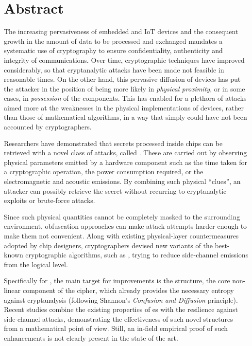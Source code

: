 \chapter*{Abstract}\label{chap:Abstract}
The increasing pervasiveness of embedded and IoT devices and the consequent growth in the amount of data to be processed and exchanged mandates a systematic use of cryptography to ensure confidentiality, authenticity and integrity of communications. Over time, cryptographic techniques have improved considerably, so that cryptanalytic attacks have been made not feasible in reasonable times. On the other hand, this pervasive diffusion of devices has put the attacker in the position of being more likely in \emph{physical proximity}, or in some cases, in \emph{possession} of the components. This has enabled for a plethora of attacks aimed more at the weaknesses in the physical implementations of devices, rather than those of mathematical algorithms, in a way that simply could have not been accounted by cryptographers.

Researchers have demonstrated that secrets processed inside chips can be retrieved with a novel class of attacks, called \sca{}. These are carried out by observing physical parameters emitted by a hardware component such as the time taken for a cryptographic operation, the power consumption required, or the electromagnetic and acoustic emissions. By combining such physical ``clues'', an attacker can possibly retrieve the secret without recurring to cryptanalytic exploits or brute-force attacks.

Since such physical quantities cannot be completely masked to the surrounding environment, obfuscation approaches can make attack attempts harder enough to make them not convenient. Along with existing physical-layer countermeasures adopted by chip designers, cryptographers devised new variants of the best-known cryptographic algorithms, such as \aes{}, trying to reduce side-channel emissions from the logical level. 
    
Specifically for \aes{}, the main target for improvements is the \sbocs{} structure, the core non-linear component of the cipher, which already provides the necessary entropy against cryptanalysis (following Shannon's \textit{Confusion and Diffusion} principle). Recent studies combine the existing properties of \sbocs{}es with the resilience against side-channel attacks, demonstrating the effectiveness of such novel structures from a mathematical point of view. Still, an in-field empirical proof of such enhancements is not clearly present in the state of the art.

